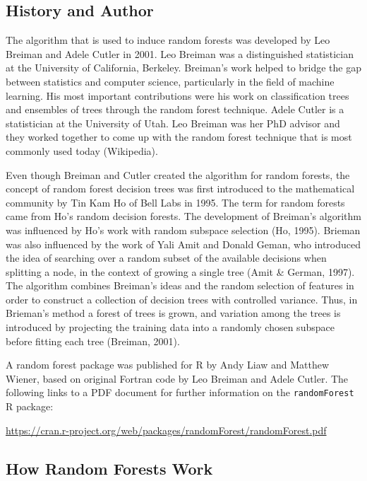 \documentclass[12pt,twoside]{reedthesis}
\begin{document}
  \subsection{History and Author}\label{history-and-author}
  
  The algorithm that is used to induce random forests was developed by Leo
  Breiman and Adele Cutler in 2001. Leo Breiman was a distinguished
  statistician at the University of California, Berkeley. Breiman's work
  helped to bridge the gap between statistics and computer science,
  particularly in the field of machine learning. His most important
  contributions were his work on classification trees and ensembles of
  trees through the random forest technique. Adele Cutler is a
  statistician at the University of Utah. Leo Breiman was her PhD advisor
  and they worked together to come up with the random forest technique
  that is most commonly used today (Wikipedia).
  
  Even though Breiman and Cutler created the algorithm for random forests,
  the concept of random forest decision trees was first introduced to the
  mathematical community by Tin Kam Ho of Bell Labs in 1995. The term for
  random forests came from Ho's random decision forests. The development
  of Breiman's algorithm was influenced by Ho's work with random subspace
  selection (Ho, 1995). Brieman was also influenced by the work of Yali
  Amit and Donald Geman, who introduced the idea of searching over a
  random subset of the available decisions when splitting a node, in the
  context of growing a single tree (Amit \& German, 1997). The algorithm
  combines Breiman's ideas and the random selection of features in order
  to construct a collection of decision trees with controlled variance.
  Thus, in Brieman's method a forest of trees is grown, and variation
  among the trees is introduced by projecting the training data into a
  randomly chosen subspace before fitting each tree (Breiman, 2001).
  
  A random forest package was published for R by Andy Liaw and Matthew
  Wiener, based on original Fortran code by Leo Breiman and Adele Cutler.
  The following links to a PDF document for further information on the
  \texttt{randomForest} R package:
  
  \url{https://cran.r-project.org/web/packages/randomForest/randomForest.pdf}
  
  \subsection{How Random Forests Work}\label{how-random-forests-work}
  
\end{document}
